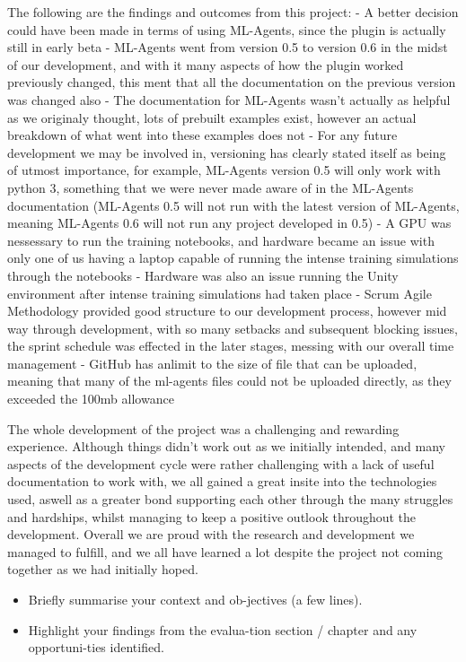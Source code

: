 The following are the findings and outcomes from this project:
- A better decision could have been made in terms of using ML-Agents, since the plugin is actually still in early beta
- ML-Agents went from version 0.5 to version 0.6 in the midst of our development, and with it many aspects of how the plugin worked previously changed, this ment that all the documentation on the previous version was changed also
- The documentation for ML-Agents wasn't actually as helpful as we originaly thought, lots of prebuilt examples exist, however an actual breakdown of what went into these examples does not
- For any future development we may be involved in, versioning has clearly stated itself as being of utmost importance, for example, ML-Agents version 0.5 will only work with python 3, something that we were never made aware of in the ML-Agents documentation (ML-Agents 0.5 will not run with the latest version of ML-Agents, meaning ML-Agents 0.6 will not run any project developed in 0.5)
- A GPU was nessessary to run the training notebooks, and hardware became an issue with only one of us having a laptop capable of running the intense training simulations through the notebooks
- Hardware was also an issue running the Unity environment after intense training simulations had taken place
- Scrum Agile Methodology provided good structure to our development process, however mid way through development, with so many setbacks and subsequent blocking issues, the sprint schedule was effected in the later stages, messing with our overall time management
- GitHub has anlimit to the size of file that can be uploaded, meaning that many of the ml-agents files could not be uploaded directly, as they exceeded the 100mb allowance

The whole development of the project was a challenging and rewarding experience. Although things didn't work out as we initially intended, and many aspects of the development cycle were rather challenging with a lack of useful documentation to work with, we all gained a great insite into the technologies used, aswell as a greater bond supporting each other through the many struggles and hardships, whilst managing to keep a positive outlook throughout the development. Overall we are proud with the research and development we managed to fulfill, and we all have learned a lot despite the project not coming together as we had initially hoped.


\begin{itemize}
\item Briefly summarise your context and ob-jectives (a few lines).
\item Highlight your findings from the evalua-tion section / chapter and any opportuni-ties identified.
\end{itemize}